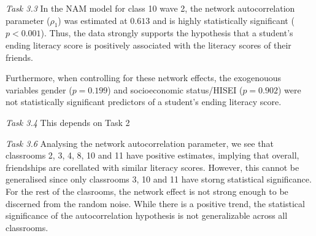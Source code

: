 \documentclass{article}
\begin{document}
\textit{Task 3.3}
In the NAM model for class 10 wave 2, the network autocorrelation parameter ($\rho_1$) was estimated at $0.613$ and is highly statistically significant ($p < 0.001$). Thus, the data strongly supports the hypothesis that a student's ending literacy score is positively associated with the literacy scores of their friends. 

Furthermore, when controlling for these network effects, the exogenouous variables gender ($p = 0.199$) and socioeconomic status/HISEI ($p = 0.902$) were not statistically significant predictors of a student's ending literacy score.

\textit{Task 3.4}  This depends on Task 2

\textit{Task 3.6}
Analysing the network autocorrelation parameter, we see that classrooms 2, 3, 4, 8, 10 and 11 have positive estimates, implying that overall, friendships are corellated with similar literacy scores. However, this cannot be generalised since only classrooms 3, 10 and 11 have storng statistical significance. For the rest of the clasrooms, the network effect is not strong enough to be discerned from the random noise. While there is a positive trend, the statistical significance of the autocorrelation hypothesis is not generalizable across all classrooms.
\end{document}
